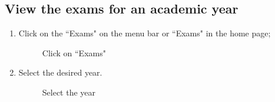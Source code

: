 \documentclass[ManualeUtente]{subfiles}
\begin{document}
\subsection{View the exams for an academic year}
\begin{enumerate}
	\item Click on the \textquotedblleft Exams" on the menu bar or \textquotedblleft Exams" in the home page;
	\begin{figure}[H]
		\centering
		\caption{Click on ``Exams"}
		\label{fig:Click on "Exams"}
	\end{figure}
	\item Select the desired year.
	\begin{figure}[H]
		\centering
		\caption{Select the year}
		\label{fig:Select the year}
	\end{figure}
\end{enumerate}
\end{document}
